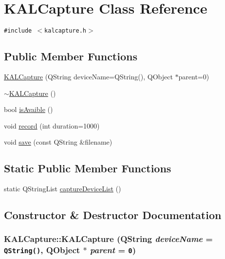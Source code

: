 \hypertarget{class_k_a_l_capture}{
\section{KALCapture Class Reference}
\label{class_k_a_l_capture}
}
{\tt \#include $<$kalcapture.h$>$}

\subsection*{Public Member Functions}
\begin{CompactItemize}
\item 
\hyperlink{class_k_a_l_capture_1550942271de6fedb22df8257d076cfe}{KALCapture} (QString deviceName=QString(), QObject $\ast$parent=0)
\item 
\hyperlink{class_k_a_l_capture_1f9f32e7f9a0385672a46a707323c83b}{$\sim$KALCapture} ()
\item 
bool \hyperlink{class_k_a_l_capture_a3688490a6cd8c1a0bc9db8d61f06d6a}{isAvaible} ()
\item 
void \hyperlink{class_k_a_l_capture_cde1d57d48b79547596ee9e32f88c76d}{record} (int duration=1000)
\item 
void \hyperlink{class_k_a_l_capture_452ce1136b1b9ed6c11479fcd3913046}{save} (const QString \&filename)
\end{CompactItemize}
\subsection*{Static Public Member Functions}
\begin{CompactItemize}
\item 
static QStringList \hyperlink{class_k_a_l_capture_65eb77b996ffb043ae7bbc99f9d6618c}{captureDeviceList} ()
\end{CompactItemize}


\subsection{Constructor \& Destructor Documentation}
\hypertarget{class_k_a_l_capture_1550942271de6fedb22df8257d076cfe}{
\subsubsection[{KALCapture}]{\setlength{\rightskip}{0pt plus 5cm}KALCapture::KALCapture (QString {\em deviceName} = {\tt QString()}, \/  QObject $\ast$ {\em parent} = {\tt 0})}}
\label{class_k_a_l_capture_1550942271de6fedb22df8257d076cfe}


